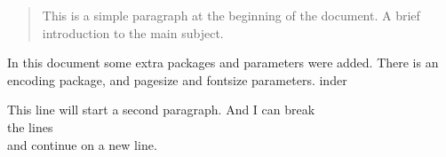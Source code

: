 \documentclass[12pt, letterpaper, twoside]{article}
\begin{document}
\begin{abstract}
This is a simple paragraph at the beginning of the document. A brief introduction to the main subject.
\end{abstract}

In this document some extra packages and parameters
were added. There is an encoding package,
and pagesize and fontsize parameters. inder

This line will start a second paragraph. And I can
 break\\ the lines \\ and continue on a new line.
\end{document}
